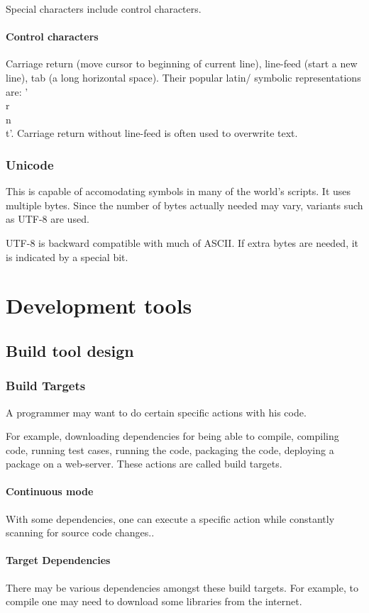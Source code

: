 \documentclass[oneside, article]{memoir}
\begin{document}
Special characters include control characters.

\subsection{Control characters}
Carriage return (move cursor to beginning of current line), line-feed (start a new line), tab (a long horizontal space). Their popular latin/ symbolic representations are: '\\r\\n\\t'. Carriage return without line-feed is often used to overwrite text.

\section{Unicode}
This is capable of accomodating symbols in many of the world's scripts. It uses multiple bytes. Since the number of bytes actually needed may vary, variants such as UTF-8 are used.

UTF-8 is backward compatible with much of ASCII. If extra bytes are needed, it is indicated by a special bit.



\part{Development tools}
\chapter{Build tool design}
\section{Build Targets}
A programmer may want to do certain specific actions with his code.

For example, downloading dependencies for being able to compile, compiling code, running test cases, running the code, packaging the code, deploying a package on a web-server. These actions are called build targets.

\subsection{Continuous mode}
With some dependencies, one can execute a specific action while constantly scanning for source code changes..

\subsection{Target Dependencies}
There may be various dependencies amongst these build targets. For example, to compile one may need to download some libraries from the internet.
\end{document}
